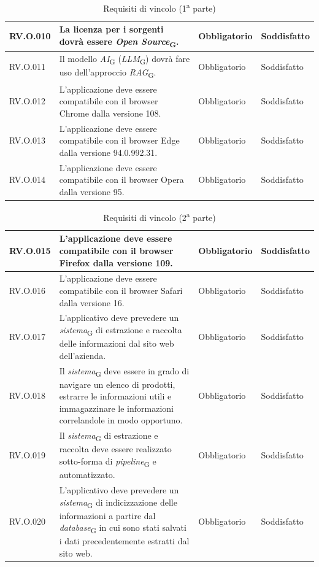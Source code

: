 \begin{table}[H]
\begin{tabular}{|C{2.7cm}|L{6.5cm}|C{2.7cm}|C{2.7cm}|}
         \hline
        RV.O.010 & La licenza per i sorgenti dovrà essere \textit{Open Source}\textsubscript{G}.
         & Obbligatorio & Soddisfatto \\
        \hline
        RV.O.011 & Il modello \textit{AI}\textsubscript{G} (\textit{LLM}\textsubscript{G}) dovrà fare uso dell’approccio \textit{RAG}\textsubscript{G}.
         & Obbligatorio & Soddisfatto \\
        \hline
        RV.O.012 & L’applicazione deve essere compatibile con il browser Chrome dalla
        versione 108.
         & Obbligatorio & Soddisfatto \\
         \hline
        RV.O.013 & L’applicazione deve essere compatibile con il browser Edge dalla versione 94.0.992.31.
         & Obbligatorio & Soddisfatto \\
        \hline
        RV.O.014 & L’applicazione deve essere compatibile con il browser Opera dalla
        versione 95.
         & Obbligatorio & Soddisfatto \\
         \hline
    \end{tabular}
    \caption{Requisiti di vincolo (1\textsuperscript{a}  parte)}
\end{table}
\begin{table}[H]
\centering
    \begin{tabular}{|C{2.7cm}|L{6.5cm}|C{2.7cm}|C{2.7cm}|}
        \hline
        RV.O.015 & L’applicazione deve essere compatibile con il browser Firefox dalla
versione 109.
         & Obbligatorio & Soddisfatto \\
        \hline
        RV.O.016 & L’applicazione deve essere compatibile con il browser Safari dalla
versione 16.
         & Obbligatorio & Soddisfatto \\
          \hline
        RV.O.017 &  L’applicativo deve prevedere un \textit{sistema}\textsubscript{G} di estrazione e raccolta delle informazioni dal sito web dell'azienda.
         & Obbligatorio & Soddisfatto \\
         \hline
         RV.O.018 & Il \textit{sistema}\textsubscript{G} deve essere in grado di navigare un elenco di prodotti, estrarre le informazioni utili e immagazzinare le informazioni correlandole in modo opportuno.
         & Obbligatorio & Soddisfatto \\
         \hline
         RV.O.019 & Il \textit{sistema}\textsubscript{G} di estrazione e raccolta deve essere realizzato sotto-forma di \textit{pipeline}\textsubscript{G} e automatizzato.
         & Obbligatorio & Soddisfatto \\
        \hline
         RV.O.020 & L’applicativo deve prevedere un \textit{sistema}\textsubscript{G} di indicizzazione delle informazioni a partire dal
        \textit{database}\textsubscript{G} in cui sono stati salvati i dati precedentemente estratti dal sito web.
         & Obbligatorio & Soddisfatto \\
        \hline
    \end{tabular}
    \caption{Requisiti di vincolo (2\textsuperscript{a}  parte)}
\end{table}


